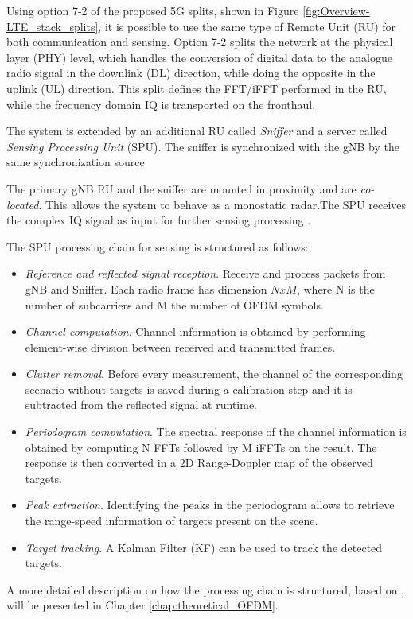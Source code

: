 	Using option 7-2 of the proposed 5G splits, shown in Figure \ref{fig:Overview-LTE_stack_splits}, it is possible to use the same type of Remote Unit (RU) for both communication and sensing.
	Option 7-2 splits the network at the physical layer (PHY) level, which handles the conversion of digital data to the analogue radio signal in the downlink (DL) direction, while doing the opposite in the uplink (UL) direction.
	This split defines the FFT/iFFT performed in the RU, while the frequency domain IQ is transported on the fronthaul.
	
	The system is extended by an additional RU called \textit{Sniffer} and a server called \textit{Sensing Processing Unit} (SPU). The sniffer is synchronized with the gNB by the same synchronization source
	
	The primary gNB RU and the sniffer are mounted in proximity and are \textit{co-located}. This allows the system to behave as a monostatic radar.The SPU receives the complex IQ signal as input for further sensing processing \cite{Wild_Grudnitsky_Mandelli_Henninger_Guan_Schaich_2023}.\
	
	The SPU processing chain for sensing is structured as follows:
	
	\begin{itemize}
		\item \textit{Reference and reflected signal reception}. Receive and process packets from gNB and Sniffer. Each radio frame has dimension $NxM$, where N is the number of subcarriers and M the number of OFDM symbols.
		\item \textit{Channel computation}. Channel information is obtained by performing element-wise division between received and transmitted frames.
		\item \textit{Clutter removal}. Before every measurement, the channel of the corresponding scenario without targets is saved during a calibration step and it is subtracted from the reflected signal at runtime.
		\item \textit{Periodogram computation}. The spectral response of the channel information is obtained by computing N FFTs followed by M iFFTs on the result. The response is then converted in a 2D Range-Doppler map of the observed targets. 
		\item \textit{Peak extraction}. Identifying the peaks in the periodogram allows to retrieve the range-speed information of targets present on the scene.
		\item \textit{Target tracking}. A Kalman Filter (KF) can be used to track the detected targets. 
	\end{itemize} 
	A more detailed description on how the processing chain is structured,  based on \cite{Braun2014OFDMRA}, will be presented in Chapter \ref{chap:theoretical_OFDM}.
	
